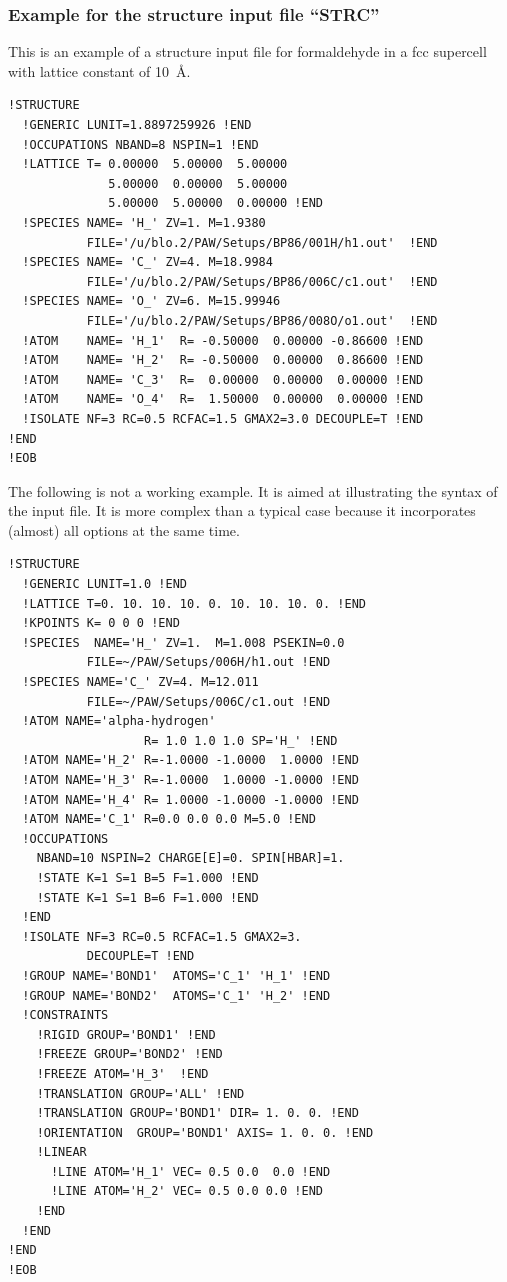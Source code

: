 \documentclass[final,12pt]{article}
\begin{document}
\subsubsection{Example for the structure input file ``STRC''}
This is an example of a structure input file for formaldehyde in a fcc
supercell with lattice constant of 10~\AA.
\begin{verbatim}
!STRUCTURE
  !GENERIC LUNIT=1.8897259926 !END   
  !OCCUPATIONS NBAND=8 NSPIN=1 !END
  !LATTICE T= 0.00000  5.00000  5.00000               
              5.00000  0.00000  5.00000               
              5.00000  5.00000  0.00000 !END
  !SPECIES NAME= 'H_' ZV=1. M=1.9380 
           FILE='/u/blo.2/PAW/Setups/BP86/001H/h1.out'  !END 
  !SPECIES NAME= 'C_' ZV=4. M=18.9984 
           FILE='/u/blo.2/PAW/Setups/BP86/006C/c1.out'  !END 
  !SPECIES NAME= 'O_' ZV=6. M=15.99946 
           FILE='/u/blo.2/PAW/Setups/BP86/008O/o1.out'  !END 
  !ATOM    NAME= 'H_1'  R= -0.50000  0.00000 -0.86600 !END
  !ATOM    NAME= 'H_2'  R= -0.50000  0.00000  0.86600 !END
  !ATOM    NAME= 'C_3'  R=  0.00000  0.00000  0.00000 !END
  !ATOM    NAME= 'O_4'  R=  1.50000  0.00000  0.00000 !END
  !ISOLATE NF=3 RC=0.5 RCFAC=1.5 GMAX2=3.0 DECOUPLE=T !END 
!END 
!EOB 
\end{verbatim}
The following is not a working example. It is aimed at illustrating
the syntax of the input file. It is more complex than a typical case
because it incorporates (almost) all options at the same time.
\begin{verbatim}
!STRUCTURE 
  !GENERIC LUNIT=1.0 !END 
  !LATTICE T=0. 10. 10. 10. 0. 10. 10. 10. 0. !END 
  !KPOINTS K= 0 0 0 !END 
  !SPECIES  NAME='H_' ZV=1.  M=1.008 PSEKIN=0.0
           FILE=~/PAW/Setups/006H/h1.out !END 
  !SPECIES NAME='C_' ZV=4. M=12.011 
           FILE=~/PAW/Setups/006C/c1.out !END 
  !ATOM NAME='alpha-hydrogen' 
                   R= 1.0 1.0 1.0 SP='H_' !END 
  !ATOM NAME='H_2' R=-1.0000 -1.0000  1.0000 !END 
  !ATOM NAME='H_3' R=-1.0000  1.0000 -1.0000 !END 
  !ATOM NAME='H_4' R= 1.0000 -1.0000 -1.0000 !END 
  !ATOM NAME='C_1' R=0.0 0.0 0.0 M=5.0 !END
  !OCCUPATIONS 
    NBAND=10 NSPIN=2 CHARGE[E]=0. SPIN[HBAR]=1. 
    !STATE K=1 S=1 B=5 F=1.000 !END 
    !STATE K=1 S=1 B=6 F=1.000 !END 
  !END
  !ISOLATE NF=3 RC=0.5 RCFAC=1.5 GMAX2=3. 
           DECOUPLE=T !END 
  !GROUP NAME='BOND1'  ATOMS='C_1' 'H_1' !END 
  !GROUP NAME='BOND2'  ATOMS='C_1' 'H_2' !END 
  !CONSTRAINTS
    !RIGID GROUP='BOND1' !END 
    !FREEZE GROUP='BOND2' !END 
    !FREEZE ATOM='H_3'  !END 
    !TRANSLATION GROUP='ALL' !END
    !TRANSLATION GROUP='BOND1' DIR= 1. 0. 0. !END
    !ORIENTATION  GROUP='BOND1' AXIS= 1. 0. 0. !END
    !LINEAR 
      !LINE ATOM='H_1' VEC= 0.5 0.0  0.0 !END 
      !LINE ATOM='H_2' VEC= 0.5 0.0 0.0 !END 
    !END 
  !END
!END 
!EOB
\end{verbatim}
\end{document}
